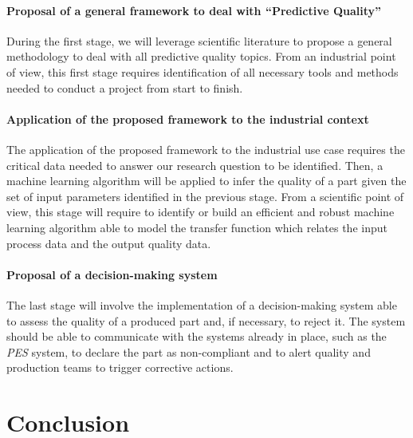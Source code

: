 \paragraph{Proposal of a general framework to deal with ``Predictive Quality''}

During the first stage, we will leverage scientific literature to propose a general methodology to deal with all predictive quality topics. From an industrial point of view, this first stage requires identification of all necessary tools and methods needed to conduct a project from start to finish. 

\paragraph{Application of the proposed framework to the industrial context}

The application of the proposed framework to the industrial use case requires the critical data needed to answer our research question to be identified. Then, a machine learning algorithm will be applied to infer the quality of a part given the set of input parameters identified in the previous stage. From a scientific point of view, this stage will require to identify or build an efficient and robust machine learning algorithm able to model the transfer function which relates the input process data and the output quality data. 

\paragraph{Proposal of a decision-making system}

The last stage will involve the implementation of a decision-making system able to assess the quality of a produced part and, if necessary, to reject it. The system should be able to communicate with the systems already in place, such as the \textit{PES} system, to declare the part as non-compliant and to alert quality and production teams to trigger corrective actions. 


\section{Conclusion}

